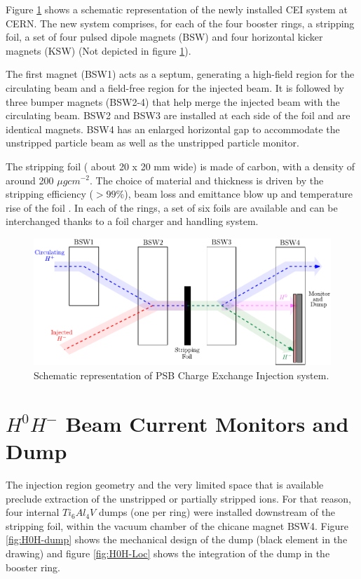 Figure \ref{fig:SchemaCEI} shows a schematic representation of the newly installed CEI system at CERN. The new system comprises, for each of the four booster rings, a stripping foil, a set of four pulsed dipole magnets (BSW) \parencite[][]{ref:BSW} and four horizontal kicker magnets (KSW) \parencite[][]{ref:KSW} (Not depicted in figure \ref{fig:SchemaCEI}). 

The first magnet (BSW1) acts as a septum, generating a high-field region for the circulating beam and a field-free region for the injected \hm beam. It is followed by three bumper magnets (BSW2-4) that help merge the injected beam with the circulating beam. BSW2 and BSW3 are installed at each side of the foil and are identical magnets. BSW4 has an enlarged horizontal gap to accommodate the unstripped particle beam as well as the unstripped particle monitor. 

The stripping foil ( about 20 x 20 mm wide) is made of carbon, with a density of around 200 $\mu g cm^{-2}$. The choice of material and thickness is driven by the stripping efficiency ($> 99 \%$), beam loss and emittance blow up and temperature rise of the foil \parencite[][]{ref:StrippingFoil}. In each of the rings, a set of six foils are available and can be interchanged thanks to a foil charger and handling system.

\begin{figure}[h]
    \centering
    \includegraphics[width=\columnwidth]{Figure_ChargeExchangeSchema/ChargeExSchema.pdf}
    \caption{Schematic representation of PSB \hm Charge Exchange Injection system.}
    \label{fig:SchemaCEI}
\end{figure}

\section{$H^{0}H^{-}$  Beam Current Monitors and Dump}
\label{sec:H0HmDet}

The injection region geometry and the very limited space that is available preclude extraction of the unstripped or partially stripped ions. For that reason, four internal $Ti_{6}Al_{4}V$ dumps (one per ring) were installed downstream of the stripping foil, within the vacuum chamber of the chicane magnet BSW4. Figure \ref{fig:H0H-dump} shows the mechanical design of the dump (black element in the drawing) and figure \ref{fig:H0H-Loc} shows the integration of the dump in the booster ring. 

